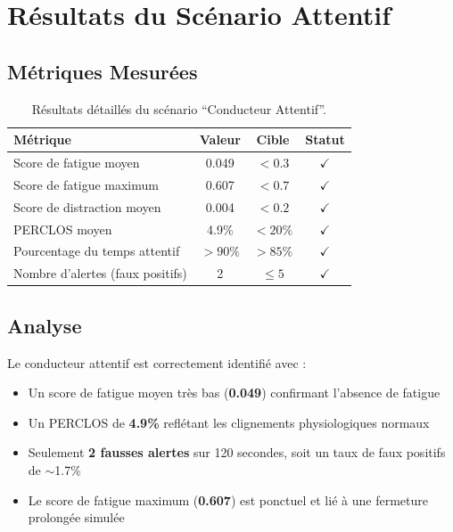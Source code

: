 \section{Résultats du Scénario Attentif}

\subsection{Métriques Mesurées}

\begin{table}[H]
\centering
\caption{Résultats détaillés du scénario ``Conducteur Attentif''.}
\label{tab:results_attentif}
\renewcommand{\arraystretch}{1.3}
\begin{tabular}{|l|c|c|c|}
\hline
\rowcolor{green!15}
\textbf{Métrique} & \textbf{Valeur} & \textbf{Cible} & \textbf{Statut} \\
\hline
Score de fatigue moyen & 0.049 & $< 0.3$ & $\checkmark$ \\
\hline
Score de fatigue maximum & 0.607 & $< 0.7$ & $\checkmark$ \\
\hline
Score de distraction moyen & 0.004 & $< 0.2$ & $\checkmark$ \\
\hline
PERCLOS moyen & 4.9\% & $< 20\%$ & $\checkmark$ \\
\hline
Pourcentage du temps attentif & $> 90\%$ & $> 85\%$ & $\checkmark$ \\
\hline
Nombre d'alertes (faux positifs) & 2 & $\leq 5$ & $\checkmark$ \\
\hline
\end{tabular}
\end{table}

\subsection{Analyse}

Le conducteur attentif est correctement identifié avec :
\begin{itemize}
    \item Un score de fatigue moyen très bas (\textbf{0.049}) confirmant l'absence de fatigue
    \item Un PERCLOS de \textbf{4.9\%} reflétant les clignements physiologiques normaux
    \item Seulement \textbf{2 fausses alertes} sur 120 secondes, soit un taux de faux positifs de $\sim$1.7\%
    \item Le score de fatigue maximum (\textbf{0.607}) est ponctuel et lié à une fermeture prolongée simulée
\end{itemize}

